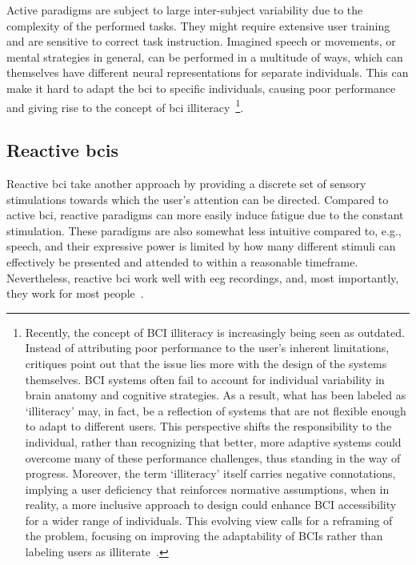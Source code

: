 Active paradigms are subject to large inter-subject variability due to the
complexity of the performed tasks.
They might require extensive user training and are sensitive to correct task
instruction.
Imagined speech or movements, or mental strategies in general, can be
performed in a multitude of ways, which can themselves have different neural
representations for separate individuals.
This can make it hard to adapt the \ac{bci} to specific individuals, causing poor
performance and giving rise to the concept of \ac{bci} illiteracy~\cite{Allison2010}\footnote{%
Recently, the concept of BCI illiteracy is increasingly being seen as outdated.
Instead of attributing poor performance to the user's inherent limitations, critiques
point out that the issue lies more with the design of the systems themselves.
BCI systems often fail to account for individual variability in brain anatomy and
cognitive strategies.
As a result, what has been labeled as `illiteracy' may, in fact, be a reflection of
systems that are not flexible enough to adapt to different users.
This perspective shifts the responsibility to the individual, rather than recognizing
that better, more adaptive systems could overcome many of these performance challenges,
thus standing in the way of progress.
Moreover, the term `illiteracy' itself carries negative connotations, implying a user
deficiency that reinforces normative assumptions, when in reality, a more inclusive
approach to design could enhance BCI accessibility for a wider range of
individuals.
This evolving view calls for a reframing of the problem, focusing on improving the
adaptability of BCIs rather than labeling users as illiterate~\cite{Becker2022,Thompson2019}.}.

\subsection{Reactive \acsp{bci}}
Reactive \ac{bci} take another approach by providing a discrete set of sensory
stimulations towards which the user's attention can be directed.
Compared to active \ac{bci}, reactive paradigms can more easily induce fatigue due to
the constant stimulation.
These paradigms are also somewhat less intuitive compared to, e.g., speech, and their
expressive power is limited by how many different stimuli can effectively be presented
and attended to within a reasonable timeframe.
Nevertheless, reactive \ac{bci} work well with \ac{eeg} recordings, and, most
importantly, they work for most people~\cite{Allison2010a,Edlinger2014}.

